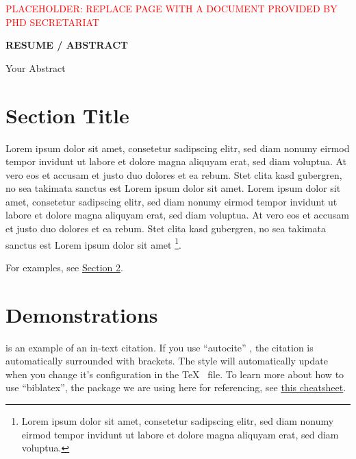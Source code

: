 \documentclass{iheid}
\begin{document}
\begin{titlepage}

\textcolor{red}{PLACEHOLDER: REPLACE PAGE WITH A DOCUMENT PROVIDED BY PHD SECRETARIAT}

\thispagestyle{firstpages}
\end{titlepage}

\begin{titlepage}
\centering{}

\vspace*{1cm}

\begin{center}
\sffamily\large\textbf{RESUME / ABSTRACT}

\sffamily\normalsize{
Your Abstract
}
\end{center}

\thispagestyle{firstpages}
\end{titlepage}
\restoregeometry %
\setcounter{page}{1} %
\tableofcontents %
\clearpage %
\listoffigures %
\listoftables %
\clearpage

\section{Section Title}\label{sec:intro}
Lorem ipsum dolor sit amet, consetetur sadipscing elitr, sed diam nonumy eirmod tempor invidunt ut labore et dolore magna aliquyam erat, sed diam voluptua. At vero eos et accusam et justo duo dolores et ea rebum. Stet clita kasd gubergren, no sea takimata sanctus est Lorem ipsum dolor sit amet. Lorem ipsum dolor sit amet, consetetur sadipscing elitr, sed diam nonumy eirmod tempor invidunt ut labore et dolore magna aliquyam erat, sed diam voluptua. At vero eos et accusam et justo duo dolores et ea rebum. Stet clita kasd gubergren, no sea takimata sanctus est Lorem ipsum dolor sit amet
\footnote{
Lorem ipsum dolor sit amet, consetetur sadipscing elitr, sed diam nonumy eirmod tempor invidunt ut labore et dolore magna aliquyam erat, sed diam voluptua.
}.

For examples, see \hyperref[sec:demo]{Section \ref{sec:demo}}.

\section{Demonstrations}\label{sec:demo}
\textcite{Hollway2017} is an example of an in-text citation. If you use ``autocite'' \autocite{Hollway2017}, the citation is automatically surrounded with brackets. 
The style will automatically update when you change it's configuration in the \TeX~ file. 
To learn more about how to use ``biblatex'', the package we are using here for referencing, see \href{http://tug.ctan.org/info/biblatex-cheatsheet/biblatex-cheatsheet.pdf}{this cheatsheet}.
\end{document}
